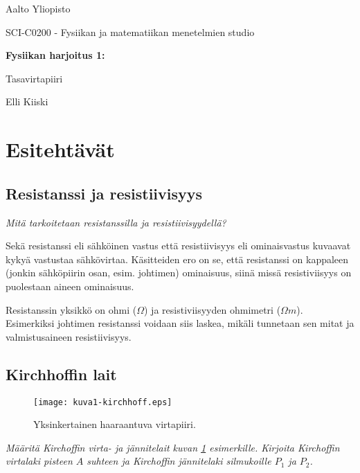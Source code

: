 \documentclass[a4paper,11pt]{article}
\begin{document}
{
\thispagestyle{empty}

{\large
Aalto Yliopisto
\par
SCI-C0200 - Fysiikan ja matematiikan menetelmien studio
}

\vspace{7cm}

{\huge \bf
Fysiikan harjoitus 1: 
\par
Tasavirtapiiri}

\vspace{2cm}

{\Large Elli Kiiski}

\clearpage

\tableofcontents

\clearpage

\section{Esitehtävät}

\subsection{Resistanssi ja resistiivisyys}

\textit{Mitä tarkoitetaan resistanssilla ja resistiivisyydellä?}

Sekä resistanssi eli sähköinen vastus että resistiivisyys eli ominaisvastus kuvaavat kykyä vastustaa sähkövirtaa. Käsitteiden ero on se, että resistanssi on kappaleen (jonkin sähköpiirin osan, esim. johtimen) ominaisuus, siinä missä resistiviisyys on puolestaan aineen ominaisuus.

Resistanssin yksikkö on ohmi ($\Omega$) ja resistiviisyyden ohmimetri ($\Omega m$). Esimerkiksi johtimen resistanssi voidaan siis laskea, mikäli tunnetaan sen mitat ja valmistusaineen resistiivisyys.

\subsection{Kirchhoffin lait}

\begin{figure}[!htb]
    \centering
    \texttt{[image: kuva1-kirchhoff.eps]}
    \caption{Yksinkertainen haaraantuva virtapiiri.}
    \label{fig:kirchhoff}
\end{figure}

\textit{Määritä Kirchoffin virta- ja jännitelait kuvan \ref{fig:kirchhoff} esimerkille. Kirjoita Kirchoffin virtalaki
pisteen $A$ suhteen ja Kirchoffin jännitelaki silmukoille $P_1$ ja $P_2$.}

}
\end{document}
